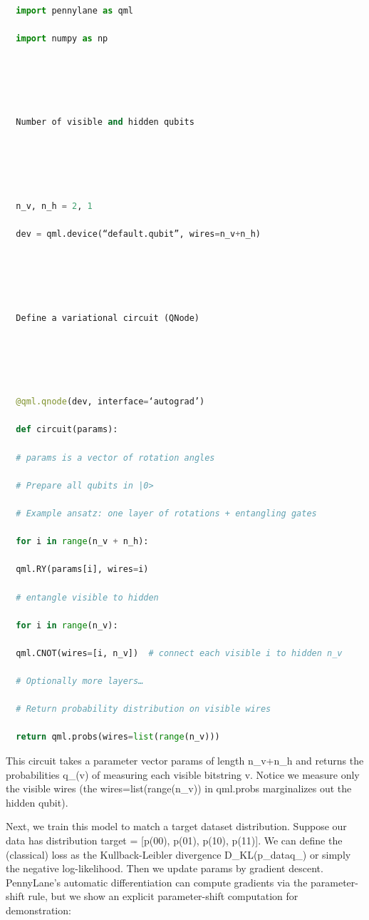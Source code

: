 \begin{lstlisting}[language=Python]

  import pennylane as qml

  import numpy as np





  Number of visible and hidden qubits





  n_v, n_h = 2, 1

  dev = qml.device(“default.qubit”, wires=n_v+n_h)





  Define a variational circuit (QNode)





  @qml.qnode(dev, interface=‘autograd’)

  def circuit(params):

  # params is a vector of rotation angles

  # Prepare all qubits in |0>

  # Example ansatz: one layer of rotations + entangling gates

  for i in range(n_v + n_h):

  qml.RY(params[i], wires=i)

  # entangle visible to hidden

  for i in range(n_v):

  qml.CNOT(wires=[i, n_v])  # connect each visible i to hidden n_v

  # Optionally more layers…

  # Return probability distribution on visible wires

  return qml.probs(wires=list(range(n_v)))

\end{lstlisting}



This circuit takes a parameter vector params of length n_v+n_h and returns the probabilities q_\theta(v) of measuring each visible bitstring v.  Notice we measure only the visible wires (the wires=list(range(n_v)) in qml.probs marginalizes out the hidden qubit).



Next, we train this model to match a target dataset distribution.  Suppose our data has distribution target = [p(00), p(01), p(10), p(11)].  We can define the (classical) loss as the Kullback-Leibler divergence D_{\rm KL}(p_{\rm data}\Vert q_\theta) or simply the negative log-likelihood.  Then we update params by gradient descent.  PennyLane’s automatic differentiation can compute gradients via the parameter-shift rule, but we show an explicit parameter-shift computation for demonstration:



